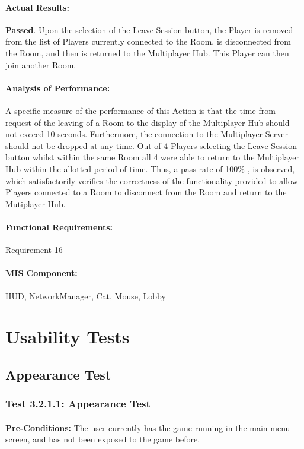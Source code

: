 \documentclass{article}
\begin{document}
    \paragraph{Actual Results:} \textbf{Passed}. Upon the selection of the Leave Session button, the Player is removed from the list of Players currently connected to the Room, is disconnected from the Room, and then is returned to the Multiplayer Hub. This Player can then join another Room.
    \paragraph{Analysis of Performance:} A specific measure of the performance of this Action is that the time from request of the leaving of a Room to the display of the Multiplayer Hub should not exceed 10 seconds. Furthermore, the connection to the Multiplayer Server should not be dropped at any time. Out of 4 Players selecting the Leave Session button whilst within the same Room all 4 were able to return to the Multiplayer Hub within the allotted period of time.  Thus, a pass rate of 100\% , is observed, which satisfactorily verifies the correctness of the functionality provided to allow Players connected to a Room to disconnect from the Room and return to the Mutiplayer Hub.
    \paragraph{Functional Requirements:} Requirement 16
    \paragraph{MIS Component:} HUD, NetworkManager, Cat, Mouse, Lobby
    
\section{Usability Tests}
\subsection{Appearance Test}
\subsubsection{Test 3.2.1.1: Appearance Test }
    \paragraph{}\textbf{Pre-Conditions:} The user currently has the game running in the main menu screen, and has not been exposed to the game before.
\end{document}
